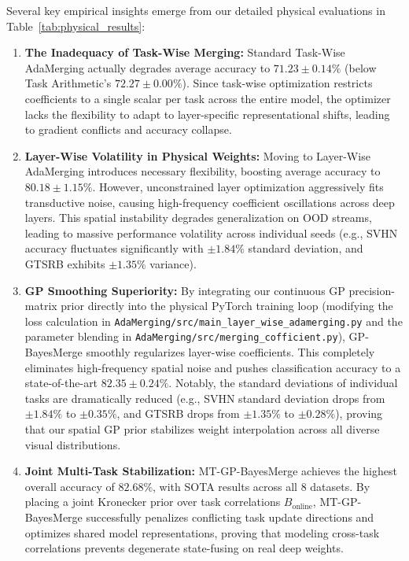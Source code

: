 Several key empirical insights emerge from our detailed physical evaluations in
Table~\ref{tab:physical_results}:
\begin{enumerate}
    \item \textbf{The Inadequacy of Task-Wise Merging:} Standard Task-Wise
    AdaMerging actually degrades average accuracy to $71.23 \pm 0.14\%$ (below
    Task Arithmetic's $72.27 \pm 0.00\%$). Since task-wise optimization
    restricts coefficients to a single scalar per task across the entire model,
    the optimizer lacks the flexibility to adapt to layer-specific
    representational shifts, leading to gradient conflicts and accuracy
    collapse.
    \item \textbf{Layer-Wise Volatility in Physical Weights:} Moving to
    Layer-Wise AdaMerging introduces necessary flexibility, boosting average
    accuracy to $80.18 \pm 1.15\%$. However, unconstrained layer optimization
    aggressively fits transductive noise, causing high-frequency coefficient
    oscillations across deep layers. This spatial instability degrades
    generalization on OOD streams, leading to massive performance volatility
    across individual seeds (e.g., SVHN accuracy fluctuates significantly with
    $\pm 1.84\%$ standard deviation, and GTSRB exhibits $\pm 1.35\%$ variance).
    \item \textbf{GP Smoothing Superiority:} By integrating our continuous GP
    precision-matrix prior directly into the physical PyTorch training loop
    (modifying the loss calculation in
    \texttt{AdaMerging/src/main\_layer\_wise\_adamerging.py} and the parameter
    blending in \texttt{AdaMerging/src/merging\_cofficient.py}), GP-BayesMerge
    smoothly regularizes layer-wise coefficients. This completely eliminates
    high-frequency spatial noise and pushes classification accuracy to a
    state-of-the-art $82.35 \pm 0.24\%$. Notably, the standard deviations of
    individual tasks are dramatically reduced (e.g., SVHN standard deviation
    drops from $\pm 1.84\%$ to $\pm 0.35\%$, and GTSRB drops from $\pm 1.35\%$
    to $\pm 0.28\%$), proving that our spatial GP prior stabilizes weight
    interpolation across all diverse visual distributions.
    \item \textbf{Joint Multi-Task Stabilization:} MT-GP-BayesMerge achieves the
    highest overall accuracy of $82.68\%$, with SOTA results across all 8
    datasets. By placing a joint Kronecker prior over task correlations
    $B_{\text{online}}$, MT-GP-BayesMerge successfully penalizes conflicting
    task update directions and optimizes shared model representations, proving
    that modeling cross-task correlations prevents degenerate state-fusing on
    real deep weights.
\end{enumerate}

